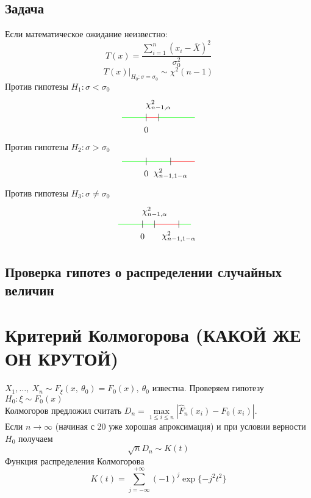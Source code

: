\documentclass[12pt, a4paper]{article}
\begin{document}
\subsection*{Задача}
Если математическое ожидание неизвестно:
\[T(x) = \frac{\sum_{i = 1}^{n} (x_i - \overline{X})^2}{\sigma_0^2}\]
\[T(x) \big|_{H_0: \sigma = \sigma_0} \sim \chi^2(n - 1)\]
Против гипотезы $H_1: \sigma < \sigma_0$
\[\begin{tikzpicture}
    \draw[green] (-1, 0) -- (0, 0);
    \draw[red] (0, 0) -- (0.5, 0);
    \draw[green] (0.5, 0) -- (2, 0);
    \draw (0, -0.15) -- ++(0, 0.3);
    \node at (0, -0.5) (a) {$0$};
    \draw (0.5, -0.15) -- ++(0, 0.3);
    \node at (0.5, 0.5) (a) {$\chi^2_{n - 1, \alpha}$};
\end{tikzpicture}\]
Против гипотезы $H_2: \sigma > \sigma_0$
\[\begin{tikzpicture}
    \draw[green] (-1, 0) -- (0, 0);
    \draw[green] (0, 0) -- (1, 0);
    \draw[red] (1, 0) -- (2, 0);
    \draw (0, -0.15) -- ++(0, 0.3);
    \node at (0, -0.5) (a) {$0$};
    \draw (1, -0.15) -- ++(0, 0.3);
    \node at (1, -0.5) (a) {$\chi^2_{n - 1, 1 - \alpha}$};
\end{tikzpicture}\]
Против гипотезы $H_3: \sigma \neq \sigma_0$
\[\begin{tikzpicture}
    \draw[green] (-1, 0) -- (0, 0);
    \draw[green] (0, 0) -- (0.5, 0);
    \draw[green] (1.5, 0) -- ++(0.5, 0);
    \draw[red] (0.5, 0) -- (1.5, 0);
    \draw (0, -0.15) -- ++(0, 0.3);
    \node at (0, -0.5) (a) {$0$};
    \draw (0.5, -0.15) -- ++(0, 0.3);
    \draw (1.5, -0.15) -- ++(0, 0.3);
    \node at (0.5, 0.5) (a) {$\chi^2_{n - 1, \alpha}$};
    \node at (1.5, -0.5) (a) {$\chi^2_{n - 1, 1 - \alpha}$};
\end{tikzpicture}\]
\subsection*{Проверка гипотез о распределении случайных величин}
\section*{Критерий Колмогорова (КАКОЙ ЖЕ ОН КРУТОЙ)}
$X_1,\dots,\ X_n \sim F_{\xi} (x,\ \theta_0) = F_0(x),\ \theta_0$ известна. Проверяем гипотезу $H_0: \xi \sim F_0(x)$\\
Колмогоров предложил считать $D_n = \max\limits_{1 \leq i \leq n} \left| \hat F_n (x_i) - F_0(x_i) \right|$.\\
Если $n\to \infty$ (начиная с 20 уже хорошая апроксимация) и при условии верности $H_0$ получаем 
\[\sqrt{n} D_n \sim K(t)\]
Функция распределения Колмогорова
\[K(t) = \sum_{j = -\infty}^{+\infty} (-1)^j \exp\{-j^2 t^2\}\]
\end{document}
